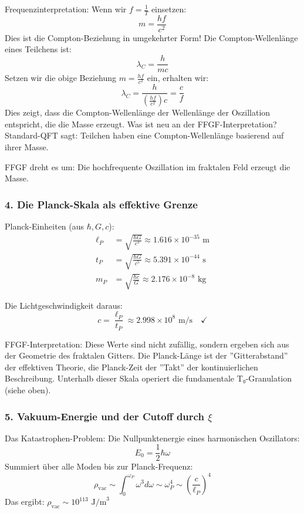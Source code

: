 	Frequenzinterpretation:
	Wenn wir \( f = \frac{1}{T} \) einsetzen:
	\[
	m = \frac{hf}{c^2}
	\]
	Dies ist die Compton-Beziehung in umgekehrter Form! Die Compton-Wellenlänge eines Teilchens ist:
	\[
	\lambda_C = \frac{h}{mc}
	\]
	Setzen wir die obige Beziehung \( m = \frac{hf}{c^2} \) ein, erhalten wir:
	\[
	\lambda_C = \frac{h}{\left(\frac{hf}{c^2}\right)c} = \frac{c}{f}
	\]
	Dies zeigt, dass die Compton-Wellenlänge der Wellenlänge der Oszillation entspricht, die die Masse erzeugt.
	Was ist neu an der FFGF-Interpretation?
	Standard-QFT sagt: Teilchen haben eine Compton-Wellenlänge basierend auf ihrer Masse.
	
	FFGF dreht es um: Die hochfrequente Oszillation im fraktalen Feld erzeugt die Masse.
	
	\subsubsection{4. Die Planck-Skala als effektive Grenze}
	Planck-Einheiten (aus \( \hbar, G, c \)):
	\begin{align}
		\ell_P &= \sqrt{\frac{\hbar G}{c^3}} \approx 1.616 \times 10^{-35} \text{ m} \\
		t_P &= \sqrt{\frac{\hbar G}{c^5}} \approx 5.391 \times 10^{-44} \text{ s} \\
		m_P &= \sqrt{\frac{\hbar c}{G}} \approx 2.176 \times 10^{-8} \text{ kg}
	\end{align}
	
	Die Lichtgeschwindigkeit daraus:
	\[
	c = \frac{\ell_P}{t_P} \approx 2.998 \times 10^8 \text{ m/s} \quad \checkmark
	\]
	
	FFGF-Interpretation:
	Diese Werte sind nicht zufällig, sondern ergeben sich aus der Geometrie des fraktalen Gitters. Die Planck-Länge ist der ''Gitterabstand'' der effektiven Theorie, die Planck-Zeit der ''Takt'' der kontinuierlichen Beschreibung. Unterhalb dieser Skala operiert die fundamentale T₀-Granulation (siehe oben).
	
	\subsubsection{5. Vakuum-Energie und der Cutoff durch \( \xi \)}
	Das Katastrophen-Problem:
	Die Nullpunktenergie eines harmonischen Oszillators:
	\[
	E_0 = \frac{1}{2}\hbar\omega
	\]
	Summiert über alle Moden bis zur Planck-Frequenz:
	\[
	\rho_{\text{vac}} \sim \int_0^{\omega_P} \omega^3 d\omega \sim \omega_P^4 \sim \left(\frac{c}{\ell_P}\right)^4
	\]
	Das ergibt: \( \rho_{\text{vac}} \sim 10^{113} \text{ J/m}^3 \)
	
